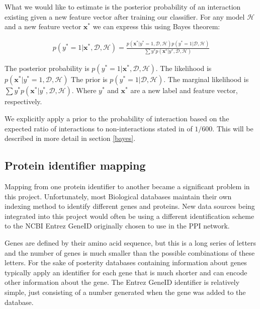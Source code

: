 What we would like to estimate is the posterior probability of an interaction existing given a new feature vector after training our classifier.
For any model $\mathcal{H}$ and a new feature vector $\pmb{x}^{*}$ we can express this using Bayes theorem:

\begin{align}
    p(y^{*} = 1 | \pmb{x}^{*}, \mathcal{D}, \mathcal{H}) = \frac{ p(\pmb{x}^{*}| y^{*} = 1 , \mathcal{D}, \mathcal{H}) p( y^{*} = 1 | \mathcal{D}, \mathcal{H})}{ \sum{y^{*}} p( \pmb{x}^{*} | y^{*}, \mathcal{D}, \mathcal{H})}
\end{align}

The posterior probability is $p(y^{*} = 1 | \pmb{x}^{*}, \mathcal{D}, \mathcal{H})$.
The likelihood is $p(\pmb{x}^{*}| y^{*} = 1 , \mathcal{D}, \mathcal{H})$
The prior is $p( y^{*} = 1 | \mathcal{D}, \mathcal{H})$.
The marginal likelihood is $\sum{y^{*}} p( \pmb{x}^{*} | y^{*}, \mathcal{D}, \mathcal{H})$.
Where $y^{*}$ and $\pmb{x}^{*}$ are a new label and feature vector, respectively.

We explicitly apply a prior to the probability of interaction based on the expected ratio of interactions to non-interactions stated in \autocite{qi_evaluation_2006} of $1/600$.
This will be described in more detail in section \ref{bayes}.

\subsection{Protein identifier mapping}

Mapping from one protein identifier to another became a significant problem in this project.
Unfortunately, most Biological databases maintain their own indexing method to identify different genes and proteins.
New data sources being integrated into this project would often be using a different identification scheme to the NCBI Entrez GeneID originally chosen to use in the PPI network.

Genes are defined by their amino acid sequence, but this is a long series of letters and the number of genes is much smaller than the possible combinations of these letters.
For the sake of posterity databases containing information about genes typically apply an identifier for each gene that is much shorter and can encode other information about the gene.
The Entrez GeneID identifier is relatively simple, just consisting of a number generated when the gene was added to the database\autocite{maglott_entrez_2007}.

